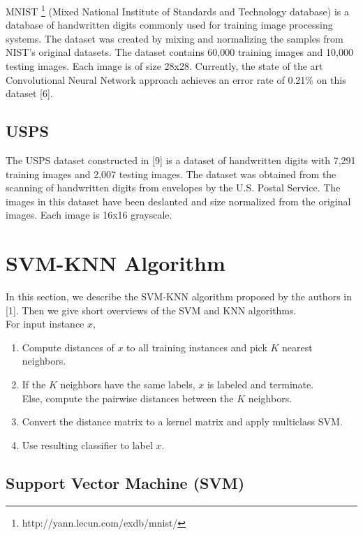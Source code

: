 \documentclass[11pt,letterpaper]{article}
\begin{document}
MNIST \footnote{http://yann.lecun.com/exdb/mnist/} (Mixed National Institute of Standards and Technology database) is a database of handwritten digits commonly used for training image processing systems. The dataset was created by mixing and normalizing the samples from NIST's original datasets. The dataset contains 60,000 training images and 10,000 testing images. Each image is of size 28x28. Currently, the state of the art Convolutional Neural Network approach achieves an error rate of 0.21$\%$ on this dataset [6].

\subsection{USPS}

The USPS dataset constructed in [9] is a dataset of handwritten digits with 7,291 training images and 2,007 testing images. The dataset was obtained from the scanning of handwritten digits from envelopes by the U.S. Postal Service. The images in this dataset have been deslanted and size normalized from the original images. Each image is 16x16 grayscale.

\section{SVM-KNN Algorithm}

In this section, we describe the SVM-KNN algorithm proposed by the authors in [1]. Then we give short overviews of the SVM and KNN algorithms.\\

For input instance $x$,
\begin{enumerate}[(1)]
\item Compute distances of $x$ to all training instances and pick $K$ nearest neighbors.
\item If the $K$ neighbors have the same labels, $x$ is labeled and terminate.\\
\qquad Else, compute the pairwise distances between the $K$ neighbors.
\item Convert the distance matrix to a kernel matrix and apply multiclass SVM.
\item Use resulting classifier to label $x$.
\end{enumerate}

\subsection{Support Vector Machine (SVM)}
\end{document}
